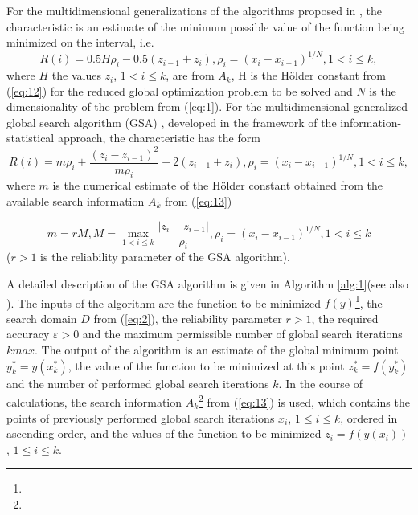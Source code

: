 \documentclass[review]{elsarticle}
\begin{document}
For the multidimensional generalizations of the algorithms proposed in \cite{c34,c35}, the characteristic is an estimate of the minimum possible value of the function being minimized on the interval, i.e.
\begin{equation}\label{eq:17}
R(i)=0.5 H \rho_i - 0.5 (z_{i-1} + z_i), \rho_i=(x_i - x_{i-1})^{1/N}, 1 < i \leq k,
\end{equation}
where $H$ the values $z_i$, $1<i \leq k$, are from $A_k$, H is the H\"older constant from (\ref{eq:12}) for the reduced global optimization problem to be solved and $N$ is the dimensionality of the problem from (\ref{eq:1}). For the multidimensional generalized global search algorithm (GSA) \cite{c6,c23}, developed in the framework of the information-statistical approach, the characteristic has the form
\begin{equation}\label{eq:18}
R(i)=m \rho_i+\frac{(z_i-z_{i-1})^2}{m \rho_i }-2(z_{i-1}+z_i ), \rho_i=(x_i-x_{i-1})^{1/N}  ,1 < i \leq k,
\end{equation}
where $m$ is the numerical estimate of the H\"older constant obtained from the available search information $A_k$ from (\ref{eq:13})

\begin{equation}\label{eq:19}
m=r M, M=\max_{1 < i \leq k} \frac{|z_i-z_{i-1}|}{\rho_i}, \rho_i=(x_i-x_{i-1})^{1/N}  ,1 < i \leq k
\end{equation}
($r>1$ is the reliability parameter of the GSA algorithm).

A detailed description of the GSA algorithm is given in Algorithm \ref{alg:1}(see also \cite{c6}). The inputs of the algorithm are the function to be minimized $f(y)$\footnote{ }, the search domain $D$ from (\ref{eq:2}), the reliability parameter $r > 1$, the required accuracy $\varepsilon > 0$ and the maximum permissible number of global search iterations $kmax$. The output of the algorithm is an estimate of the global minimum point $y_k^* =y(x_k^*)$, the value of the function to be minimized at this point $z_k^* =f(y_k^*)$  and the number of performed global search iterations $k$. In the course of calculations, the search information $A_k$\footnote{ } from (\ref{eq:13}) is used, which contains the points of previously performed global search iterations $x_i$, $1 \leq i \leq k$, ordered in ascending order, and the values of the function to be minimized $z_i=f(y(x_i))$, $1\leq i \leq k$.
\end{document}
